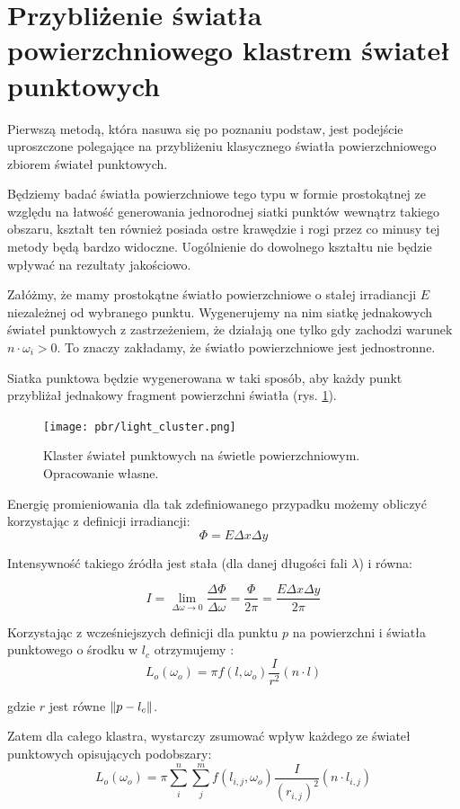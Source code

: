 \documentclass[../main.tex]{subfiles}
\begin{document}
\section{Przybliżenie światła powierzchniowego klastrem świateł punktowych}

Pierwszą metodą, która nasuwa się po poznaniu podstaw, jest podejście uproszczone polegające na przybliżeniu klasycznego światła powierzchniowego zbiorem świateł punktowych.

Będziemy badać światła powierzchniowe tego typu w formie prostokątnej ze względu na łatwość generowania jednorodnej siatki punktów wewnątrz takiego obszaru, kształt ten również posiada ostre krawędzie i rogi przez co minusy tej metody będą bardzo widoczne. Uogólnienie do dowolnego kształtu nie będzie wpływać na rezultaty jakościowo.

Załóżmy, że mamy prostokątne światło powierzchniowe o stałej irradiancji $E$ niezależnej od wybranego punktu. Wygenerujemy na nim siatkę jednakowych świateł punktowych z zastrzeżeniem, że działają one tylko gdy zachodzi warunek $n \cdot \omega_i > 0 $. To znaczy zakładamy, że światło powierzchniowe jest jednostronne.

Siatka punktowa będzie wygenerowana w taki sposób, aby każdy punkt przybliżał jednakowy fragment powierzchni światła (rys. \ref{fig:PointLightCluster}).

\begin{figure}[ht]
  \centering
  \texttt{[image: pbr/light\_cluster.png]}
  \caption{Klaster świateł punktowych na świetle powierzchniowym. Opracowanie własne.}
  \label{fig:PointLightCluster}
\end{figure}

Energię promieniowania dla tak zdefiniowanego przypadku możemy obliczyć korzystając z definicji irradiancji:
\begin{equation}
	\Phi = E \Delta{x} \Delta{y}
\end{equation}

Intensywność takiego źródła jest stała (dla danej długości fali $\lambda$) i równa: 

\begin{equation}
  I 
	= \lim_{\Delta\omega \rightarrow 0} {
		\frac{\Delta\Phi}{\Delta\omega}
	} 
	= \frac{\Phi}{2\pi}
	= \frac{E\Delta{x}\Delta{y}}{2\pi}
\end{equation}

Korzystając z wcześniejszych definicji dla punktu $p$ na powierzchni i światła punktowego o środku w $l_c$ otrzymujemy \cite{pbr_frostbite}:
\begin{equation}
	L_o(\omega_o) = \pi f(l, \omega_o) \frac{I}{r^2} (n \cdot l)
\end{equation}

\noindent gdzie $r$ jest równe $\norm{p-l_c}$.

Zatem dla całego klastra, wystarczy zsumować wpływ każdego ze świateł punktowych opisujących podobszary:
\begin{equation}
	L_o(\omega_o) = \pi \sum_{i}^{n} \sum_{j}^{m} {
		f(l_{i,j}, \omega_o) \frac{I}{(r_{i,j})^2} (n \cdot l_{i,j})
	}
\end{equation}
\end{document}
